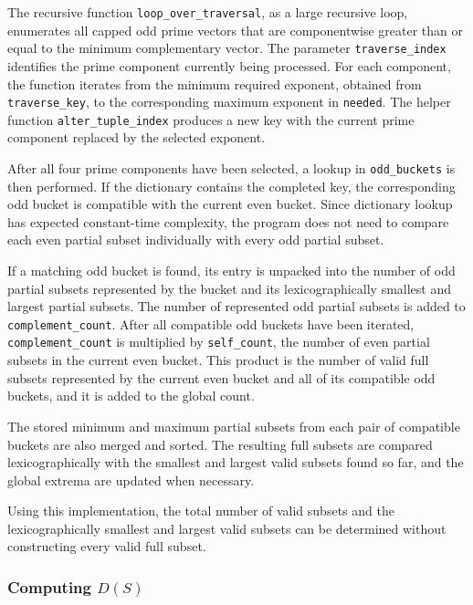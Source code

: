 \documentclass[11pt,a4paper]{article}
\begin{document}
The recursive function \texttt{loop\_over\_traversal}, as a large recursive loop, enumerates all capped odd prime vectors that are componentwise greater than or equal to the minimum complementary vector. The parameter \texttt{traverse\_index} identifies the prime component currently being processed. For each component, the function iterates from the minimum required exponent, obtained from \texttt{traverse\_key}, to the corresponding maximum exponent in \texttt{needed}. The helper function \texttt{alter\_tuple\_index} produces a new key with the current prime component replaced by the selected exponent.

After all four prime components have been selected, a lookup in \texttt{odd\_buckets} is then performed. If the dictionary contains the completed key, the corresponding odd bucket is compatible with the current even bucket.
Since dictionary lookup has expected constant-time complexity, the program does not need to compare each even partial subset individually with every odd partial subset.

If a matching odd bucket is found, its entry is unpacked into the number of odd partial subsets represented by the bucket and its lexicographically smallest and largest partial subsets. The number of represented odd partial subsets is added to \texttt{complement\_count}. After all compatible odd buckets have been iterated, \texttt{complement\_count} is multiplied by \texttt{self\_count}, the number of even partial subsets in the current even bucket. This product is the number of valid full subsets represented by the current even bucket and all of its compatible odd buckets, and it is added to the global count.

The stored minimum and maximum partial subsets from each pair of compatible buckets are also merged and sorted. The resulting full subsets are compared lexicographically with the smallest and largest valid subsets found so far, and the global extrema are updated when necessary.

Using this implementation, the total number of valid subsets and the lexicographically smallest and largest valid subsets can be determined without constructing every valid full subset.


\subsubsection*{Computing \(D(S)\)}
\end{document}
